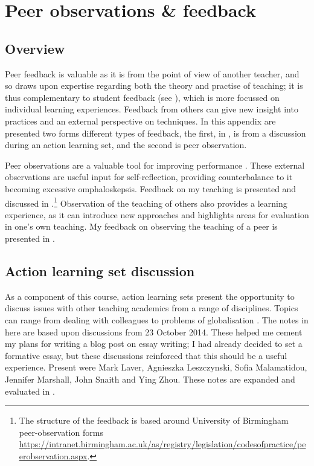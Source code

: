 \chapter{Peer observations \& feedback}\label{ap:peer}

\section{Overview}

Peer feedback is valuable as it is from the point of view of another teacher, and so draws upon expertise regarding both the theory and practise of teaching; it is thus complementary to student feedback (see ), which is more focussed on individual learning experiences. Feedback from others can give new insight into practices and an external perspective on techniques. In this appendix are presented two forms different types of feedback, the first, in , is from a discussion during an action learning set, and the second is peer observation.

Peer observations are a valuable tool for improving performance \citep{Ketteridge2015}. These external observations are useful input for self-reflection, providing counterbalance to it becoming excessive omphaloskepsis. Feedback on my teaching is presented and discussed in .\footnote{The structure of the feedback is based around University of Birmingham peer-observation forms \url{https://intranet.birmingham.ac.uk/as/registry/legislation/codesofpractice/peerobservation.aspx}.} Observation of the teaching of others also provides a learning experience, as it can introduce new approaches and highlights areas for evaluation in one's own teaching. My feedback on observing the teaching of a peer is presented in .

\section{Action learning set discussion}\label{sec:ALS}

As a component of this course, action learning sets present the opportunity to discuss issues with other teaching academics from a range of disciplines. Topics can range from dealing with colleagues to problems of globalisation \citep[cf.][]{Marshall2015}. The notes in  here are based upon discussions from 23 October 2014. These helped me cement my plans for writing a blog post on essay writing; I had already decided to set a formative essay, but these discussions reinforced that this should be a useful experience. Present were Mark Laver, Agnieszka Leszczynski, Sofia Malamatidou, Jennifer Marshall, John Snaith and Ying Zhou. These notes are expanded and evaluated in .

